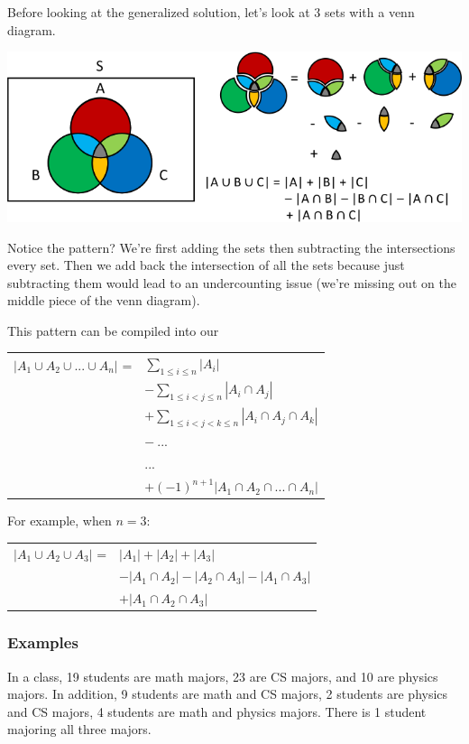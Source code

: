 \documentclass[12pt, letterpaper]{article}
\newcommand{\cul}[1]{%
		\uline{\phantom{#1}}%
		\llap{\contour{white}{#1}}%
	}
\begin{document}
Before looking at the generalized solution, let's look at 3 sets with a venn diagram.
\begin{center}
	\strut\vspace*{-\baselineskip}\newline\includegraphics[width=\linewidth]{images/PrinceExInVenn3Way.png}
\end{center}
Notice the pattern? We're first adding the sets then subtracting the intersections every set. Then we add back the intersection of all the sets because just subtracting them would lead to an undercounting issue (we're missing out on the middle piece of the venn diagram).

This pattern can be compiled into our \cul{generalization:} \smallbreak
\begin{tabular}{l l}
	$|A_1 \cup A_2 \cup ... \cup A_n|$ = & $\sum_{1 \le i \le n} |A_i|$ \\
	& $- \sum_{1 \le i < j  \le n} |A_i \cap A_j|$ \\
	& $+ \sum_{1 \le i < j < k \le n} |A_i \cap A_j \cap A_k|$ \\
	& $- \ ...$ \\
	& ... \\
	& $ + (-1)^{n+1} |A_1 \cap A_2 \cap ... \cap A_n|$
\end{tabular} \smallbreak
For example, when $n=3$: \smallbreak
\begin{tabular}{l l}
	$|A_1 \cup A_2 \cup A_3|$ = & $|A_1| + |A_2| + |A_3|$ \\
	& $- |A_1 \cap A_2| - |A_2 \cap A_3| - |A_1 \cap A_3|$ \\
	& $+ |A_1 \cap A_2 \cap A_3|$
\end{tabular}

\pagebreak

\subsubsection*{Examples}
In a class, 19 students are math majors, 23 are CS majors, and 10
are physics majors. In addition, 9 students are math and CS
majors, 2 students are physics and CS majors, 4 students are math
and physics majors. There is 1 student majoring all three majors.
\end{document}
